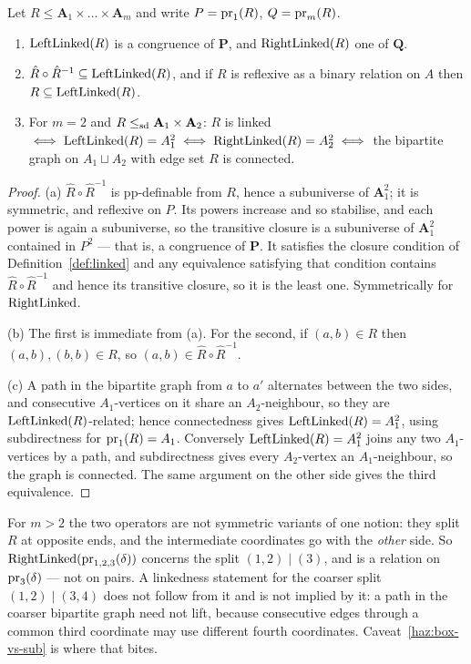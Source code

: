\begin{lemma}\label{lem:linked-basics}
Let $R\le\mathbf A_{1}\times\dots\times\mathbf A_{m}$ and write
$P=\operatorname*{pr}_{1}(R)$, $Q=\operatorname*{pr}_{m}(R)$.
\begin{enumerate}\alphlabels\tightlist
\item $\operatorname{LeftLinked}(R)$ is a congruence of $\mathbf P$, and $\operatorname{RightLinked}(R)$
  one of $\mathbf Q$.
\item $\hat R\circ\hat R^{-1}\subseteq\operatorname{LeftLinked}(R)$, and if $R$ is
  reflexive as a binary relation on $A$ then $R\subseteq\operatorname{LeftLinked}(R)$.
\item For $m=2$ and $R\le_{\mathrm{sd}}\mathbf A_{1}\times\mathbf A_{2}$: $R$ is linked
  $\iff\operatorname{LeftLinked}(R)=A_{1}^{2}\iff\operatorname{RightLinked}(R)=A_{2}^{2}\iff$ the
  bipartite graph on $A_{1}\sqcup A_{2}$ with edge set $R$ is connected.
\end{enumerate}
\end{lemma}

\begin{proof}
(a) $\hat R\circ\hat R^{-1}$ is pp-definable from $R$, hence a subuniverse of
$\mathbf A_{1}^{2}$; it is symmetric, and reflexive on $P$. Its powers
increase and so stabilise, and each power is again a subuniverse, so the
transitive closure is a subuniverse of $\mathbf A_{1}^{2}$ contained in
$P^{2}$ --- that is, a congruence of $\mathbf P$. It satisfies the closure
condition of Definition~\ref{def:linked} and any equivalence satisfying that
condition contains $\hat R\circ\hat R^{-1}$ and hence its transitive closure,
so it is the least one. Symmetrically for $\operatorname{RightLinked}$.

(b) The first is immediate from (a). For the second, if $(a,b)\in R$ then
$(a,b),(b,b)\in R$, so $(a,b)\in\hat R\circ\hat R^{-1}$.

(c) A path in the bipartite graph from $a$ to $a'$ alternates between the two
sides, and consecutive $A_{1}$-vertices on it share an $A_{2}$-neighbour, so
they are $\operatorname{LeftLinked}(R)$-related; hence connectedness gives
$\operatorname{LeftLinked}(R)=A_{1}^{2}$, using subdirectness for $\operatorname*{pr}_{1}(R)=A_{1}$.
Conversely $\operatorname{LeftLinked}(R)=A_{1}^{2}$ joins any two $A_{1}$-vertices by a path,
and subdirectness gives every $A_{2}$-vertex an $A_{1}$-neighbour, so the graph
is connected. The same argument on the other side gives the third equivalence.
\end{proof}

\begin{hazard}\label{haz:linked-split}
For $m>2$ the two operators are not symmetric variants of one notion: they
split $R$ at opposite ends, and the intermediate coordinates go with the
\emph{other} side. So $\operatorname{RightLinked}(\operatorname*{pr}_{1,2,3}(\delta))$ concerns the split
$(1,2)\mid(3)$, and is a relation on $\operatorname*{pr}_{3}(\delta)$ --- not on pairs. A
linkedness statement for the coarser split $(1,2)\mid(3,4)$ does not follow
from it and is not implied by it: a path in the coarser bipartite graph need
not lift, because consecutive edges through a common third coordinate may use
different fourth coordinates. Caveat~\ref{haz:box-vs-sub} is where that bites.
\end{hazard}

